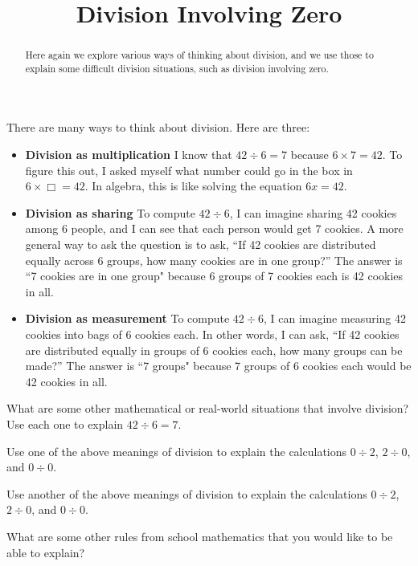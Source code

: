 \documentclass{ximera}
\title{Division Involving Zero}
\begin{document}
\begin{abstract}
Here again we explore various ways of thinking about division, and we use those to explain some difficult division situations, such as division involving zero.
\end{abstract}
\maketitle


There are many ways to think about division.  Here are three:
\begin{itemize}
\item \textbf{Division as multiplication}  I know that $42\div 6=7$ because $6\times 7=42$.  To figure this out, I asked myself what number could go in the box in $6\times \Box =42$.  In algebra, this is like solving the equation $6x=42$.

\item \textbf{Division as sharing}  To compute $42\div 6$, I can imagine sharing 42 cookies among 6 people, and I can see that each person would get 7 cookies. A more general way to ask the question is to ask, ``If 42 cookies are distributed equally across 6 groups, how many cookies are in one group?''  The answer is ``7 cookies are in one group" because 6 groups of 7 cookies each is 42 cookies in all.  

\item \textbf{Division as measurement}  To compute  $42\div 6$, I can imagine measuring 42 cookies into bags of 6 cookies each.  In other words, I can ask, ``If 42 cookies are distributed equally in groups of 6 cookies each, how many groups can be made?''  The answer is ``7 groups"  because 7 groups of 6 cookies each would be 42 cookies in all.   
\end{itemize}

\begin{problem}
What are some other mathematical or real-world situations that involve division?  Use each one to explain $42\div 6=7$.  
\begin{freeResponse}
\end{freeResponse}
\end{problem}

\begin{problem}
Use one of the above meanings of division to explain the calculations $0\div 2$, $2\div 0$, and $0\div 0$.  
\begin{freeResponse}
\end{freeResponse}
\end{problem}

\begin{problem}
Use another of the above meanings of division to explain the calculations $0\div 2$, $2\div 0$, and $0\div 0$.  
\begin{freeResponse}
\end{freeResponse}
\end{problem}

\begin{problem}
What are some other rules from school mathematics that you would like to be able to explain?  
\begin{freeResponse}
\end{freeResponse}
\end{problem}
\end{document}
